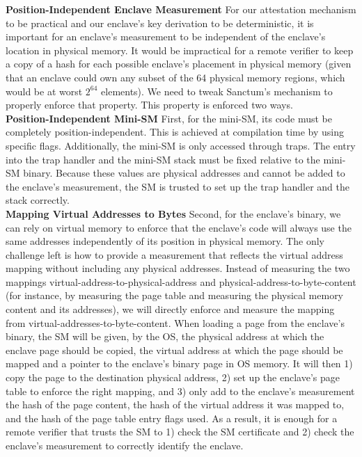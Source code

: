 \noindent\textbf{Position-Independent Enclave Measurement}
For our attestation mechanism to be practical and our enclave's key derivation to be deterministic, it is important for an enclave's measurement to be independent of the enclave's location in physical memory.
It would be impractical for a remote verifier to keep a copy of a hash for each possible enclave's placement in physical memory (given that an enclave could own any subset of the 64 physical memory regions, which would be at worst $2^{64}$ elements).
We need to tweak Sanctum's mechanism to properly enforce that property.
This property is enforced two ways.
\\
\noindent\textbf{Position-Independent Mini-SM}
First, for the mini-SM, its code must be completely position-independent. 
This is achieved at compilation time by using specific flags. 
Additionally, the mini-SM is only accessed through traps.
The entry into the trap handler and the mini-SM stack must be fixed relative to the mini-SM binary.
Because these values are physical addresses and cannot be added to the enclave's measurement, the SM is trusted to set up the trap handler and the stack correctly.
\\

\noindent\textbf{Mapping Virtual Addresses to Bytes}
Second, for the enclave's binary, we can rely on virtual memory to enforce that the enclave's code will always use the same addresses independently of its position in physical memory.
The only challenge left is how to provide a measurement that reflects the virtual address mapping without including any physical addresses. Instead of measuring the two mappings virtual-address-to-physical-address and physical-address-to-byte-content (for instance, by measuring the page table and measuring the physical memory content and its addresses), we will directly enforce and measure the mapping from virtual-addresses-to-byte-content.
When loading a page from the enclave's binary, the SM will be given, by the OS, the physical address at which the enclave page should be copied, the virtual address at which the page should be mapped and a pointer to the enclave's binary page in OS memory. 
It will then 1) copy the page to the destination physical address, 2) set up the enclave's page table to enforce the right mapping, and 3) only add to the enclave's measurement the hash of the page content, the hash of the virtual address it was mapped to, and the hash of the page table entry flags used.
As a result, it is enough for a remote verifier that trusts the SM to 1) check the SM certificate and 2) check the enclave's measurement to correctly identify the enclave.
\\

